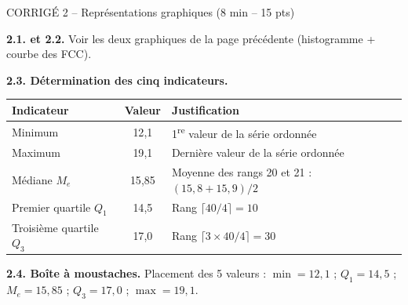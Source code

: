 \documentclass[11pt,a4paper]{article}
\begin{document}
\begin{epreuve}{CORRIGÉ 2 -- Représentations graphiques \hfill \small (8 min -- 15 pts)}

\vspace{0.2cm}
\textbf{2.1. et 2.2.} Voir les deux graphiques de la page précédente (histogramme + courbe des FCC).

\vspace{0.2cm}
\textbf{2.3. Détermination des cinq indicateurs.}

\begin{center}
\renewcommand{\arraystretch}{1.35}
\begin{tabular}{|l|c|l|}
\hline
\rowcolor{corrige!15}
\textbf{Indicateur} & \textbf{Valeur} & \textbf{Justification} \\
\hline
Minimum & 12{,}1 & 1\textsuperscript{re} valeur de la série ordonnée \\
\hline
Maximum & 19{,}1 & Dernière valeur de la série ordonnée \\
\hline
Médiane $M_e$ & 15{,}85 & Moyenne des rangs 20 et 21 : $(15{,}8+15{,}9)/2$ \\
\hline
Premier quartile $Q_1$ & 14{,}5 & Rang $\lceil 40/4 \rceil = 10$ \\
\hline
Troisième quartile $Q_3$ & 17{,}0 & Rang $\lceil 3\times40/4 \rceil = 30$ \\
\hline
\end{tabular}
\end{center}

\medskip
\textbf{2.4. Boîte à moustaches.} Placement des 5 valeurs : $\min=12{,}1$ ; $Q_1=14{,}5$ ; $M_e=15{,}85$ ; $Q_3=17{,}0$ ; $\max=19{,}1$.

\begin{center}
\end{center}


\end{epreuve}
\end{document}
